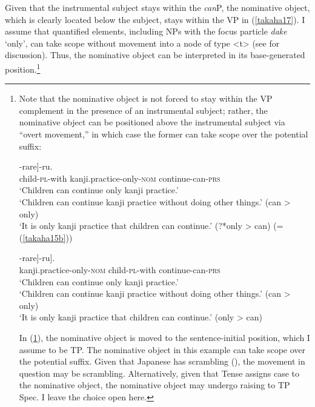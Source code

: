\documentclass[output=paper]{langscibook}
\begin{document}
Given that the instrumental subject stays within the \emph{can}P, the nominative object, which is clearly located below the subject, stays within the VP in (\ref{takaha17}). I assume that quantified elements, including NPs with the focus particle \emph{dake} ‘only’, can take scope without movement into a node of type <t> (see \citealt{Blok2017} for discussion). Thus, the nominative object can be interpreted in its base-generated position.\footnote{Note that the nominative object is not forced to stay within the VP complement in the presence of an instrumental subject; rather, the nominative object can be positioned above the instrumental subject via “overt movement,” in which case the former can take scope over the potential suffix: 
\begin{exe}
\ex 
\begin{xlist}
\ex \label{takahaiaa}
\gll [$_{\textnormal{canP}}$ {Kodomo-tati-de} [$_{\textnormal{VP}}$ {kanzirensyuu-dake-ga} {tuzuke}]-{rare}]-{ru}.\\
{} child-\textsc{pl}-with {} kanji.practice-only-\textsc{nom} continue-can-\textsc{prs}\\
\glt ‘Children can continue only kanji practice.’\\
‘Children can continue kanji practice without doing other things.’ (can \textgreater{} only)\\
‘It is only kanji practice that children can continue.’ (?*only \textgreater{} can) (= (\ref{takaha15b}))

\ex \label{takahaibb}
\gll [$_{\textnormal{TP}}$ {Kanzirensyuu-dake$_{\textnormal{i}}$-ga} [$_{\textnormal{canP}}$ {kodomo-tati-de} [$_{\textnormal{VP}}$ {\textit{t}$_{\textnormal{i}}$} {tuzuke}]-{rare}]-{ru}].\\
{} kanji.practice-only-\textsc{nom} {} child-\textsc{pl}-with {} {} continue-can-\textsc{prs}\\
\glt ‘Children can continue only kanji practice.’\\
‘Children can continue kanji practice without doing other things.’ (can \textgreater{} only)\\
‘It is only kanji practice that children can continue.’ (only \textgreater{} can)
\end{xlist}
\end{exe}
In (\ref{takahaibb}), the nominative object is moved to the sentence-initial position, which I assume to be TP. The nominative object in this example can take scope over the potential suffix. Given that Japanese has scrambling (\citealt{Saito1985}), the movement in question may be scrambling. Alternatively, given that Tense assigns case to the nominative object, the nominative object may undergo raising to TP Spec. I leave the choice open here.}
\end{document}
